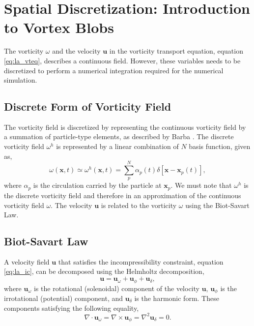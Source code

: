 \section{Spatial Discretization: Introduction to Vortex Blobs}
\label{sec:spatialDiscretization}

The vorticity $\omega$ and the velocity $\mathbf{u}$ in the vorticity transport equation, equation \ref{eq:la_vteq}, describes a continuous field. However, these variables needs to be discretized to perform a numerical integration required for the numerical simulation. 

\subsection{Discrete Form of Vorticity Field}
\label{subsec:discreteVorticity}
The vorticity field is discretized by representing the continuous vorticity field by a summation of particle-type elements, as described by Barba \cite{Barba2010a}. The discrete vorticity field $\omega^h$ is represented by a linear combination of $N$ basis function, given as,
	\begin{equation}
	\omega\left(\mathbf{x},t\right) \simeq \omega^h\left(\mathbf{x},t\right) = \sum_{p}^N\alpha_p\left(t\right)\delta \left[\mathbf{x}-\mathbf{x}_p\left(t\right)\right],
	\end{equation}
where $\alpha_{p}$ is the circulation carried by the particle at $\mathbf{x}_p$. We must note that $\omega^h$ is the discrete vorticity field and therefore in an approximation of the continuous vorticity field $\omega$. 
The velocity $\mathbf{u}$ is related to the vorticity $\omega$ using the Biot-Savart Law.

\subsection{Biot-Savart Law}
A velocity field $\mathbf{u}$ that satisfies the incompressibility constraint, equation \ref{eq:la_ic}, can be decomposed using the Helmholtz decomposition,
	\begin{equation}
	\mathbf{u} = \mathbf{u}_{\omega} + \mathbf{u}_{\phi} + \mathbf{u}_{\delta},
	\label{eq:helmholtz}
	\end{equation}
where $\mathbf{u}_{\omega}$ is the rotational (solenoidal) component of the velocity $\mathbf{u}$, $\mathbf{u}_{\phi}$ is the irrotational (potential) component, and $\mathbf{u}_{\delta}$ is the harmonic form. These components satisfying the following equality,
	\begin{equation}
	\nabla \cdot \mathbf{u}_{\omega} = \nabla \times \mathbf{u}_{\phi} = \nabla^2\mathbf{u}_{\delta} = 0.
	\end{equation}
 
